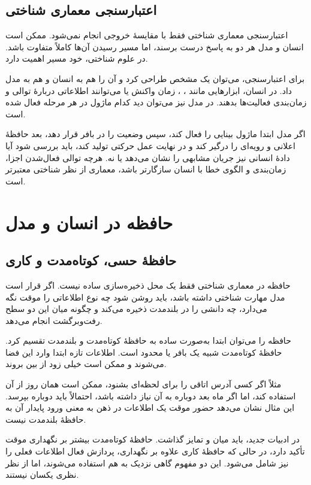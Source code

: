 \subsection{اعتبارسنجی معماری شناختی}
اعتبارسنجی معماری شناختی فقط با مقایسهٔ خروجی انجام نمی‌شود. ممکن است انسان و مدل هر دو به پاسخ درست برسند، اما مسیر رسیدن آن‌ها کاملاً متفاوت باشد. در علوم شناختی، خود مسیر اهمیت دارد.

برای اعتبارسنجی، می‌توان یک  مشخص طراحی کرد و آن را هم به انسان و هم به مدل داد. در انسان، ابزارهایی مانند ، ، زمان واکنش یا  می‌توانند اطلاعاتی دربارهٔ توالی و زمان‌بندی فعالیت‌ها بدهند. در مدل نیز می‌توان دید کدام ماژول در هر مرحله فعال شده است.

اگر مدل ابتدا ماژول بینایی را فعال کند، سپس وضعیت را در بافر قرار دهد، بعد حافظهٔ اعلانی و رویه‌ای را درگیر کند و در نهایت عمل حرکتی تولید کند، باید بررسی شود آیا دادهٔ انسانی نیز جریان مشابهی را نشان می‌دهد یا نه. هرچه توالی فعال‌شدن اجزا، زمان‌بندی و الگوی خطا با انسان سازگارتر باشد، معماری از نظر شناختی معتبرتر است.

\section{حافظه در انسان و مدل}

\subsection{حافظهٔ حسی، کوتاه‌مدت و کاری}
حافظه در معماری شناختی فقط یک محل ذخیره‌سازی ساده نیست. اگر قرار است مدل مهارت شناختی داشته باشد، باید روشن شود چه نوع اطلاعاتی را موقت نگه می‌دارد، چه دانشی را در بلندمدت ذخیره می‌کند و چگونه میان این دو سطح رفت‌وبرگشت انجام می‌دهد.

حافظه را می‌توان ابتدا به‌صورت ساده به حافظهٔ کوتاه‌مدت و بلندمدت تقسیم کرد. حافظهٔ کوتاه‌مدت شبیه یک بافر یا  محدود است. اطلاعات تازه ابتدا وارد این فضا می‌شوند و ممکن است خیلی زود از بین بروند.

مثلاً اگر کسی آدرس اتاقی را برای لحظه‌ای بشنود، ممکن است همان روز از آن استفاده کند، اما اگر ماه بعد دوباره به آن نیاز داشته باشد، احتمالاً باید دوباره بپرسد. این مثال نشان می‌دهد حضور موقت یک اطلاعات در ذهن به معنی ورود پایدار آن به حافظهٔ بلندمدت نیست.

در ادبیات جدید، باید میان  و  تمایز گذاشت. حافظهٔ کوتاه‌مدت بیشتر بر نگهداری موقت تأکید دارد، در حالی که حافظهٔ کاری علاوه بر نگهداری، پردازش فعال اطلاعات فعلی را نیز شامل می‌شود. این دو مفهوم گاهی نزدیک به هم استفاده می‌شوند، اما از نظر نظری یکسان نیستند.

